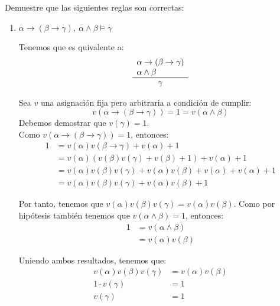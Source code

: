 \begin{ejercicio*}
    Demuestre que las siguientes reglas son correctas:

    \begin{enumerate}
        \item $\alpha\rightarrow(\beta\rightarrow\gamma),~\alpha\land\beta \vDash \gamma$
        
        Tenemos que es quivalente a:
        \begin{equation*}
            \begin{array}{l}
                \alpha\rightarrow(\beta\rightarrow\gamma)\\
                \alpha\land\beta \\ \hline
                \multicolumn{1}{c}{\gamma}
            \end{array}
        \end{equation*}
        
    Sea $v$ una asignación fija pero arbitraria a condición de cumplir:
    \begin{equation*}
        v(\alpha\rightarrow(\beta\rightarrow\gamma)) = 1 = v(\alpha\land \beta)
    \end{equation*}
    Debemos demostrar que $v(\gamma)=1$.\\

    Como $v(\alpha\rightarrow(\beta\rightarrow\gamma))=1$, entonces:
    \begin{align*}
        1 &= v(\alpha)v(\beta\rightarrow\gamma)+v(\alpha)+1\\
          &= v(\alpha)(v(\beta)v(\gamma)+v(\beta)+1)+v(\alpha)+1\\
          &= v(\alpha)v(\beta)v(\gamma)+v(\alpha)v(\beta)+v(\alpha)+v(\alpha)+1\\
          &= v(\alpha)v(\beta)v(\gamma)+v(\alpha)v(\beta)+1
    \end{align*}

    Por tanto, tenemos que $v(\alpha)v(\beta)v(\gamma)=v(\alpha)v(\beta)$.
    Como por hipótesis también tenemos que $v(\alpha\land\beta)=1$, entonces:
    \begin{align*}
        1 &= v(\alpha \land \beta)\\
        &= v(\alpha)v(\beta)
    \end{align*}

    Uniendo ambos resultados, tenemos que:
    \begin{align*}
        v(\alpha)v(\beta)v(\gamma)&=v(\alpha)v(\beta)\\
        1\cdot v(\gamma)&=1\\
        v(\gamma)&=1
    \end{align*}
    

\end{enumerate}
\end{ejercicio*}
